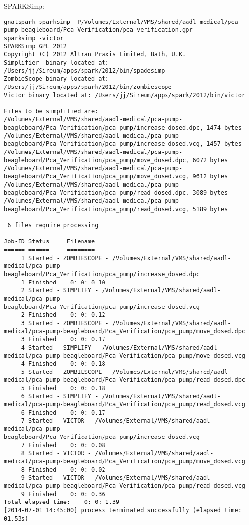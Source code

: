 SPARKSimp:
\begin{lstlisting}
gnatspark sparksimp -P/Volumes/External/VMS/shared/aadl-medical/pca-pump-beagleboard/Pca_Verification/pca_verification.gpr
sparksimp -victor
SPARKSimp GPL 2012
Copyright (C) 2012 Altran Praxis Limited, Bath, U.K.
Simplifier  binary located at: /Users/jj/Sireum/apps/spark/2012/bin/spadesimp
ZombieScope binary located at: /Users/jj/Sireum/apps/spark/2012/bin/zombiescope
Victor binary located at: /Users/jj/Sireum/apps/spark/2012/bin/victor

Files to be simplified are:
/Volumes/External/VMS/shared/aadl-medical/pca-pump-beagleboard/Pca_Verification/pca_pump/increase_dosed.dpc, 1474 bytes
/Volumes/External/VMS/shared/aadl-medical/pca-pump-beagleboard/Pca_Verification/pca_pump/increase_dosed.vcg, 1457 bytes
/Volumes/External/VMS/shared/aadl-medical/pca-pump-beagleboard/Pca_Verification/pca_pump/move_dosed.dpc, 6072 bytes
/Volumes/External/VMS/shared/aadl-medical/pca-pump-beagleboard/Pca_Verification/pca_pump/move_dosed.vcg, 9612 bytes
/Volumes/External/VMS/shared/aadl-medical/pca-pump-beagleboard/Pca_Verification/pca_pump/read_dosed.dpc, 3089 bytes
/Volumes/External/VMS/shared/aadl-medical/pca-pump-beagleboard/Pca_Verification/pca_pump/read_dosed.vcg, 5189 bytes

 6 files require processing

Job-ID Status     Filename
====== ======     ========
     1 Started - ZOMBIESCOPE - /Volumes/External/VMS/shared/aadl-medical/pca-pump-beagleboard/Pca_Verification/pca_pump/increase_dosed.dpc
     1 Finished    0: 0: 0.10
     2 Started - SIMPLIFY - /Volumes/External/VMS/shared/aadl-medical/pca-pump-beagleboard/Pca_Verification/pca_pump/increase_dosed.vcg
     2 Finished    0: 0: 0.12
     3 Started - ZOMBIESCOPE - /Volumes/External/VMS/shared/aadl-medical/pca-pump-beagleboard/Pca_Verification/pca_pump/move_dosed.dpc
     3 Finished    0: 0: 0.17
     4 Started - SIMPLIFY - /Volumes/External/VMS/shared/aadl-medical/pca-pump-beagleboard/Pca_Verification/pca_pump/move_dosed.vcg
     4 Finished    0: 0: 0.18
     5 Started - ZOMBIESCOPE - /Volumes/External/VMS/shared/aadl-medical/pca-pump-beagleboard/Pca_Verification/pca_pump/read_dosed.dpc
     5 Finished    0: 0: 0.18
     6 Started - SIMPLIFY - /Volumes/External/VMS/shared/aadl-medical/pca-pump-beagleboard/Pca_Verification/pca_pump/read_dosed.vcg
     6 Finished    0: 0: 0.17
     7 Started - VICTOR - /Volumes/External/VMS/shared/aadl-medical/pca-pump-beagleboard/Pca_Verification/pca_pump/increase_dosed.vcg
     7 Finished    0: 0: 0.08
     8 Started - VICTOR - /Volumes/External/VMS/shared/aadl-medical/pca-pump-beagleboard/Pca_Verification/pca_pump/move_dosed.vcg
     8 Finished    0: 0: 0.02
     9 Started - VICTOR - /Volumes/External/VMS/shared/aadl-medical/pca-pump-beagleboard/Pca_Verification/pca_pump/read_dosed.vcg
     9 Finished    0: 0: 0.36
Total elapsed time:    0: 0: 1.39
[2014-07-01 14:45:00] process terminated successfully (elapsed time: 01.53s)
\end{lstlisting}

